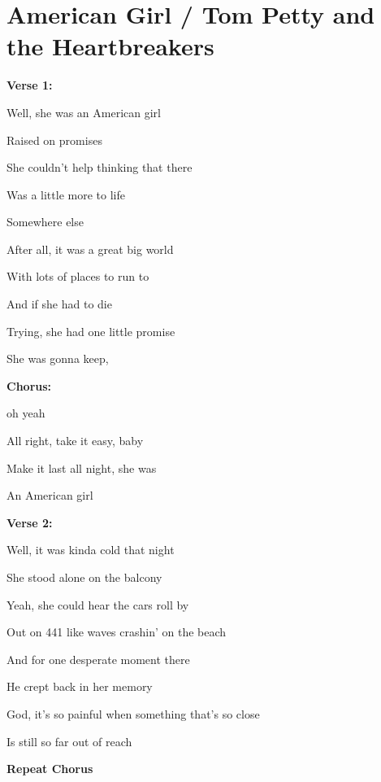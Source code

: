 \section{American Girl / Tom Petty and the Heartbreakers}\label{sec:americangirl}
\Cmajor
\Dmajor
\Fmajor
\Aminor

\textbf{Verse 1:}

Well, she was an American girl

Raised on promises

She couldn't help thinking that there

Was a little more to life

Somewhere else

After all, it was a great big world

With lots of places to run to

And if she had to die

Trying, she had one little promise

She was gonna keep,

\textbf{Chorus:}

oh yeah

All right, take it easy, baby

Make it last all night, she was

An American girl

\textbf{Verse 2:}

Well, it was kinda cold that night

She stood alone on the balcony

Yeah, she could hear the cars roll by

Out on 441 like waves crashin' on the beach

And for one desperate moment there

He crept back in her memory

God, it's so painful when something that's so close

Is still so far out of reach

\textbf{Repeat Chorus}


